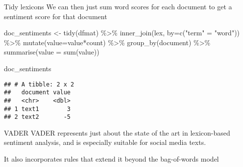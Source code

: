 \documentclass[
  10pt,
  ignorenonframetext,
  aspectratio=169]{beamer}
\newenvironment{Shaded}{\begin{snugshade}}{\end{snugshade}}
\newcommand{\AttributeTok}[1]{\textcolor[rgb]{0.80,0.80,0.80}{#1}}
\newcommand{\FunctionTok}[1]{\textcolor[rgb]{0.94,0.94,0.56}{#1}}
\newcommand{\NormalTok}[1]{\textcolor[rgb]{0.80,0.80,0.80}{#1}}
\newcommand{\OtherTok}[1]{\textcolor[rgb]{0.94,0.94,0.56}{#1}}
\newcommand{\SpecialCharTok}[1]{\textcolor[rgb]{0.86,0.64,0.64}{#1}}
\newcommand{\StringTok}[1]{\textcolor[rgb]{0.80,0.58,0.58}{#1}}
\begin{document}
\begin{frame}[fragile]{Tidy lexicons}
\protect\hypertarget{tidy-lexicons-1}{}
We can then just sum word scores for each document to get a sentiment
score for that document

\medskip
\scriptsize

\begin{Shaded}
\begin{Highlighting}[]
\NormalTok{doc\_sentiments }\OtherTok{\textless{}{-}} \FunctionTok{tidy}\NormalTok{(dfmat) }\SpecialCharTok{\%\textgreater{}\%} 
  \FunctionTok{inner\_join}\NormalTok{(lex, }\AttributeTok{by=}\FunctionTok{c}\NormalTok{(}\StringTok{"term"} \OtherTok{=} \StringTok{"word"}\NormalTok{)) }\SpecialCharTok{\%\textgreater{}\%}
  \FunctionTok{mutate}\NormalTok{(}\AttributeTok{value=}\NormalTok{value}\SpecialCharTok{*}\NormalTok{count) }\SpecialCharTok{\%\textgreater{}\%}
  \FunctionTok{group\_by}\NormalTok{(document) }\SpecialCharTok{\%\textgreater{}\%}
  \FunctionTok{summarise}\NormalTok{(}\AttributeTok{value =} \FunctionTok{sum}\NormalTok{(value))}

\NormalTok{doc\_sentiments}
\end{Highlighting}
\end{Shaded}

\begin{verbatim}
## # A tibble: 2 x 2
##   document value
##   <chr>    <dbl>
## 1 text1        3
## 2 text2       -5
\end{verbatim}
\end{frame}

\begin{frame}{VADER}
\protect\hypertarget{vader}{}
VADER represents just about the state of the art in lexicon-based
sentiment analysis, and is especially suitable for social media texts.

It also incorporates rules that extend it beyond the bag-of-words model
\end{frame}
\end{document}
